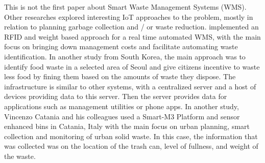 This is not the first paper about Smart Waste Management Systems (WMS).
Other researches explored interesting IoT approaches to the problem, mostly in relation to planning garbage collection and / or waste reduction.
 implemented an RFID and weight  based approach for a real time automated WMS, with the main focus on bringing down management costs and facilitate automating waste identification.
 In another study from South Korea, the main approach was to identify food waste in a selected area of Seoul and give citizens incentive to waste less food by fining them based on the amounts of waste they dispose.
The infrastructure is similar to other systems, with a centralized server and a host of devices providing data to this server.
Then the server provides data for applications such as management utilities or phone apps.
 In another study, Vincenzo Catania and his colleagues used a Smart-M3 Platform and sensor enhanced bins in Catania, Italy with the main focus on urban planning, smart collection and  monitoring of urban solid waste. In this case, the information that was collected was on the location of the trash can, level of fullness, and weight of the waste.